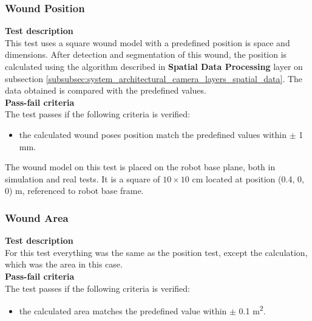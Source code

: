 \subsubsection*{Wound Position}
\label{subsubsec:system_validation_tests_setup_camera_spatial_data_processing_position}

\hspace{.6cm}\textbf{Test description}\\
This test uses a square wound model with a predefined position is space and dimensions. After detection and segmentation of this wound, the position is calculated using the algorithm described in \textbf{Spatial Data Processing} layer on subsection \ref{subsubsec:system_architectural_camera_layers_spatial_data}. The data obtained is compared with the predefined values.\\

\textbf{Pass-fail criteria}\\
The test passes if the following criteria is verified:
\begin{itemize}
    \item the calculated wound poses position match the predefined values within $\pm$ 1 \si{\milli\meter}.
\end{itemize}

The wound model on this test is placed on the robot base plane, both in simulation and real tests. It is a square of $10\times10$ \si{\centi\meter} located at position (0.4, 0, 0) \si{\meter}, referenced to robot base frame.

\subsubsection*{Wound Area}
\label{subsubsec:system_validation_tests_setup_camera_spatial_data_processing_area}

\hspace{.6cm}\textbf{Test description}\\
For this test everything was the same as the position test, except the calculation, which was the area in this case.\\

\textbf{Pass-fail criteria}\\
The test passes if the following criteria is verified:
\begin{itemize}
    \item the calculated area matches the predefined value within $\pm$ 0.1 \si{\meter\squared}.
\end{itemize}
 
